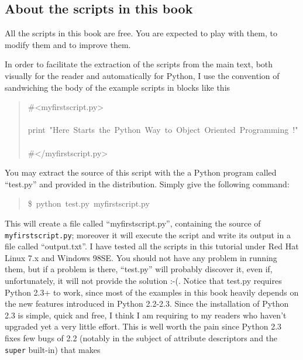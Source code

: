 \documentclass[10pt,english]{article}
\begin{document}

\hypertarget{about-the-scripts-in-this-book}{}
\subsection*{About the scripts in this book}

All the scripts  in this book are free. You are expected to play
with them, to modify them and to improve them.

In order to facilitate the extraction of the scripts from the main text, both
visually for the reader and automatically for Python, I use the
convention of sandwiching the body of the example scripts in blocks like this
\begin{quote}
\begin{ttfamily}\begin{flushleft}
\mbox{{\#}<myfirstscript.py>}\\
\mbox{}\\
\mbox{print~"Here~Starts~the~Python~Way~to~Object~Oriented~Programming~!"}\\
\mbox{}\\
\mbox{{\#}</myfirstscript.py>}
\end{flushleft}\end{ttfamily}
\end{quote}

You may extract the source of this script with the a Python program
called ``test.py'' and provided in the distribution. Simply give the 
following command:
\begin{quote}
\begin{ttfamily}\begin{flushleft}
\mbox{{\$}~python~test.py~myfirstscript.py}
\end{flushleft}\end{ttfamily}
\end{quote}

This will create a file called ``myfirstscript.py'', containing the
source of \texttt{myfirstscript.py}; moreover it will execute the script 
and write its output in a file called ``output.txt''. I have tested
all the scripts in this tutorial under Red Hat Linux 7.x and 
Windows 98SE. You should not have any problem in running them,
but if a problem is there, ``test.py'' will probably discover it,
even if, unfortunately, it will not provide the solution :-(.
Notice that test.py requires Python 2.3+ to work, since most of
the examples in this book heavily depends on the new features
introduced in Python 2.2-2.3. Since the installation of Python 
2.3 is simple, quick and free, I think I am requiring to my readers
who haven't upgraded yet a very little effort. This is well worth
the pain since Python 2.3 fixes few bugs of 2.2 (notably in the subject of
attribute descriptors and the \texttt{super} built-in) that makes
\end{document}
